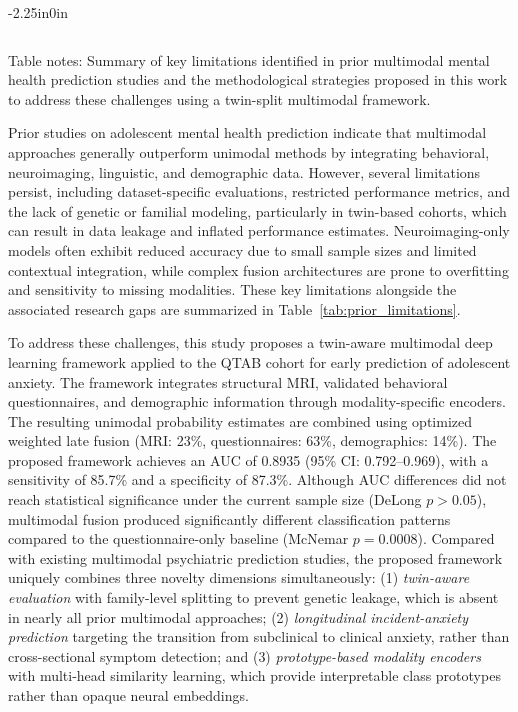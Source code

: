 \documentclass[10pt,letterpaper]{article}
\begin{document}
\begin{table}[!t]
\begin{adjustwidth}{-2.25in}{0in}
\begin{tabular}{|p{1.5cm}|p{2.2cm}|p{3.4cm}|p{3.8cm}|p{4.6cm}|}
\end{tabular}

\begin{flushleft}
Table notes: Summary of key limitations identified in prior multimodal mental health prediction studies and the methodological strategies proposed in this work to address these challenges using a twin-split multimodal framework.
\end{flushleft}

\end{adjustwidth}
\end{table}

Prior studies on adolescent mental health prediction indicate that multimodal approaches generally outperform unimodal methods by integrating behavioral, neuroimaging, linguistic, and demographic data. However, several limitations persist, including dataset-specific evaluations, restricted performance metrics, and the lack of genetic or familial modeling, particularly in twin-based cohorts, which can result in data leakage and inflated performance estimates. Neuroimaging-only models often exhibit reduced accuracy due to small sample sizes and limited contextual integration, while complex fusion architectures are prone to overfitting and sensitivity to missing modalities. These key limitations alongside the associated research gaps are summarized in Table~\ref{tab:prior_limitations}.


To address these challenges, this study proposes a twin-aware multimodal deep learning framework applied to the QTAB cohort for early prediction of adolescent anxiety. The framework integrates structural MRI, validated behavioral questionnaires, and demographic information through modality-specific encoders. The resulting unimodal probability estimates are combined using optimized weighted late fusion (MRI: 23\%, questionnaires: 63\%, demographics: 14\%). The proposed framework achieves an AUC of 0.8935 (95\% CI: 0.792--0.969), with a sensitivity of 85.7\% and a specificity of 87.3\%. Although AUC differences did not reach statistical significance under the current sample size (DeLong $p > 0.05$), multimodal fusion produced significantly different classification patterns compared to the questionnaire-only baseline (McNemar $p = 0.0008$). Compared with existing multimodal psychiatric prediction studies, the proposed framework uniquely combines three novelty dimensions simultaneously: (1) \emph{twin-aware evaluation} with family-level splitting to prevent genetic leakage, which is absent in nearly all prior multimodal approaches; (2) \emph{longitudinal incident-anxiety prediction} targeting the transition from subclinical to clinical anxiety, rather than cross-sectional symptom detection; and (3) \emph{prototype-based modality encoders} with multi-head similarity learning, which provide interpretable class prototypes rather than opaque neural embeddings.
\end{document}
